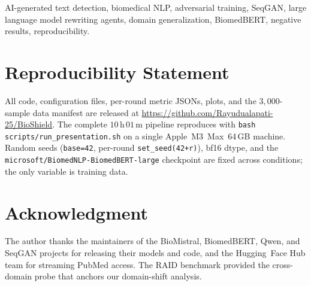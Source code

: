 \documentclass[conference]{IEEEtran}
\begin{document}
\begin{IEEEkeywords}
AI-generated text detection, biomedical NLP, adversarial training,
SeqGAN, large language model rewriting agents, domain generalization,
BiomedBERT, negative results, reproducibility.
\end{IEEEkeywords}










\section*{Reproducibility Statement}
All code, configuration files, per-round metric JSONs, plots, and the
\(3{,}000\)-sample data manifest are released at
\url{https://github.com/Rayudualapati-25/BioShield}. The complete
\(10\,\mathrm{h}\,01\,\mathrm{m}\) pipeline reproduces with
\texttt{bash scripts/run\_presentation.sh} on a single Apple~M3~Max~64\,GB
machine. Random seeds (\texttt{base=42}, per-round
\texttt{set\_seed(42+r)}), bf16 dtype, and the
\texttt{microsoft/BiomedNLP-BiomedBERT-large} checkpoint are fixed across
conditions; the only variable is training data.

\section*{Acknowledgment}
The author thanks the maintainers of the BioMistral, BiomedBERT, Qwen, and
SeqGAN projects for releasing their models and code, and the Hugging~Face Hub
team for streaming PubMed access. The RAID benchmark
\cite{dugan2024raid} provided the cross-domain probe that anchors our
domain-shift analysis.



\end{document}
